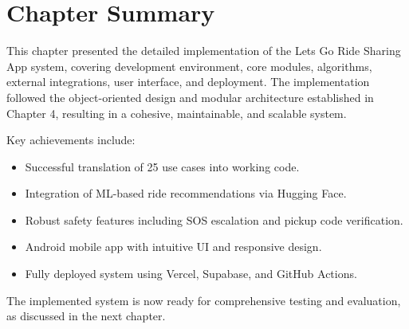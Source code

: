
\section*{Chapter Summary}

This chapter presented the detailed implementation of the Lets Go Ride Sharing App system, covering development environment, core modules, algorithms, external integrations, user interface, and deployment. The implementation followed the object-oriented design and modular architecture established in Chapter 4, resulting in a cohesive, maintainable, and scalable system.

Key achievements include:
\begin{itemize}
    \item Successful translation of 25 use cases into working code.
    \item Integration of ML-based ride recommendations via Hugging Face.
    \item Robust safety features including SOS escalation and pickup code verification.
    \item Android mobile app with intuitive UI and responsive design.
    \item Fully deployed system using Vercel, Supabase, and GitHub Actions.

\end{itemize}

The implemented system is now ready for comprehensive testing and evaluation, as discussed in the next chapter.
